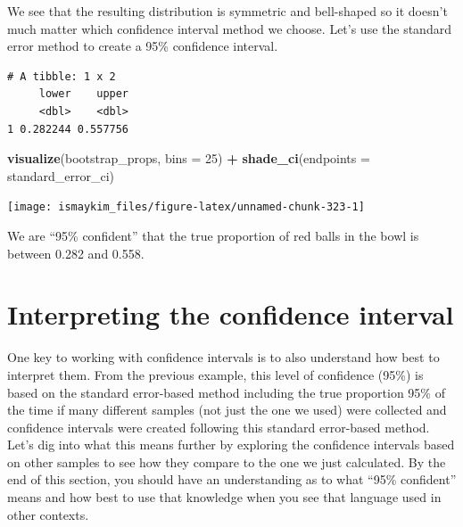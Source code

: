\documentclass[12pt, krantz2,]{krantz}
\makeatletter
\newenvironment{Shaded}{\begin{snugshade}}{\end{snugshade}}
\newcommand{\DataTypeTok}[1]{\textcolor[rgb]{0.27,0.27,0.27}{#1}}
\newcommand{\DecValTok}[1]{\textcolor[rgb]{0.06,0.06,0.06}{#1}}
\newcommand{\FloatTok}[1]{\textcolor[rgb]{0.06,0.06,0.06}{#1}}
\newcommand{\KeywordTok}[1]{\textcolor[rgb]{0.27,0.27,0.27}{\textbf{#1}}}
\newcommand{\NormalTok}[1]{#1}
\newcommand{\OperatorTok}[1]{\textcolor[rgb]{0.43,0.43,0.43}{\textbf{#1}}}
\newcommand{\StringTok}[1]{\textcolor[rgb]{0.5,0.5,0.5}{#1}}
\newenvironment{kframe}{%
\medskip{}
\setlength{\fboxsep}{.8em}
 \def\at@end@of@kframe{}%
 \ifinner\ifhmode%
  \def\at@end@of@kframe{\end{minipage}}%
  \begin{minipage}{\columnwidth}%
 \fi\fi%
 \def\FrameCommand##1{\hskip\@totalleftmargin \hskip-\fboxsep
 \colorbox{shadecolor}{##1}\hskip-\fboxsep
     \hskip-\linewidth \hskip-\@totalleftmargin \hskip\columnwidth}%
 \MakeFramed {\advance\hsize-\width
   \@totalleftmargin\z@ \linewidth\hsize
   \@setminipage}}%
 {\par\unskip\endMakeFramed%
 \at@end@of@kframe}
\renewenvironment{Shaded}{\begin{kframe}}{\end{kframe}}
\makeatother
\begin{document}
We see that the resulting distribution is symmetric and bell-shaped so it doesn't much matter which confidence interval method we choose. Let's use the standard error method to create a 95\% confidence interval.

\begin{Shaded}
\end{Shaded}

\begin{verbatim}
# A tibble: 1 x 2
     lower    upper
     <dbl>    <dbl>
1 0.282244 0.557756
\end{verbatim}

\begin{Shaded}
\begin{Highlighting}[]
\KeywordTok{visualize}\NormalTok{(bootstrap_props, }\DataTypeTok{bins =} \DecValTok{25}\NormalTok{) }\OperatorTok{+}\StringTok{ }
\StringTok{  }\KeywordTok{shade_ci}\NormalTok{(}\DataTypeTok{endpoints =}\NormalTok{ standard_error_ci)}
\end{Highlighting}
\end{Shaded}

\begin{center}\texttt{[image: ismaykim\_files/figure-latex/unnamed-chunk-323-1]} \end{center}

We are ``95\% confident'' that the true proportion of red balls in the bowl is between 0.282 and 0.558.

\hypertarget{interpreting-the-confidence-interval}{%
\section{Interpreting the confidence interval}\label{interpreting-the-confidence-interval}}

One key to working with confidence intervals is to also understand how best to interpret them. From the previous example, this level of confidence (95\%) is based on the standard error-based method including the true proportion 95\% of the time if many different samples (not just the one we used) were collected and confidence intervals were created following this standard error-based method. Let's dig into what this means further by exploring the confidence intervals based on other samples to see how they compare to the one we just calculated. By the end of this section, you should have an understanding as to what ``95\% confident'' means and how best to use that knowledge when you see that language used in other contexts.
\end{document}
